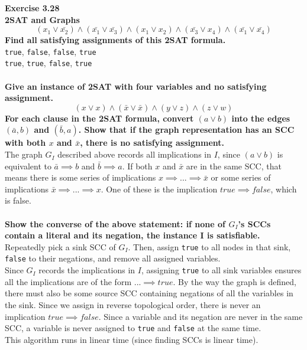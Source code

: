 \documentclass{article}
\newenvironment{problem}[2][Exercise]
    { \begin{mdframed}[backgroundcolor=gray!20] \textbf{#1 #2} \\}
    {  \end{mdframed}}
\begin{document}
\begin{problem}{3.28}
    \textbf{2SAT and Graphs}
    \[
        (x_1 \lor \bar{x_2}) \wedge (\bar{x_1} \lor \bar{x_3}) \wedge (x_1 \lor x_2) \wedge (\bar{x_3} \lor x_4) \wedge (\bar{x_1} \lor \bar{x_4})
    \]
    \textbf{Find all satisfying assignments of this 2SAT formula.}
    \\
    \texttt{true}, \texttt{false}, \texttt{false}, \texttt{true}
    \\
    \texttt{true}, \texttt{true}, \texttt{false}, \texttt{true}
    \\
    \\
    \textbf{Give an instance of 2SAT with four variables and no satisfying assignment.}
    \[
        (x \lor x) \wedge (\bar{x} \lor \bar{x}) \wedge (y \lor z) \wedge (z \lor w)
    \]
    \textbf{For each clause in the 2SAT formula, convert $(a \lor b)$ into the edges $(\bar{a}, b)$ and $(\bar{b}, a)$. Show that if the graph representation has an SCC with both $x$ and $\bar{x}$, there is no satisfying assignment.}
    \\
    The graph $G_I$ described above records all implications in $I$, since $(a \lor b)$ is equivalent to $\bar{a} \implies b$ and $\bar{b} \implies a$. If both $x$ and $\bar{x}$ are in the same SCC, that means there is some series of implications $x \implies ... \implies \bar{x}$ or some series of implications $\bar{x} \implies ... \implies x$. One of these is the implication $true \implies false$, which is false.
    \\
    \\
    \textbf{Show the converse of the above statement: if none of $G_I$'s SCCs contain a literal and its negation, the instance I is satisfiable.}
    \\
    Repeatedly pick a sink SCC of $G_I$. Then, assign \texttt{true} to all nodes in that sink, \texttt{false} to their negations, and remove all assigned variables. 
    \\
    Since $G_I$ records the implications in $I$, assigning \texttt{true} to all sink variables ensures all the implications are of the form $... \implies true$. By the way the graph is defined, there must also be some source SCC containing negations of all the variables in the sink. Since we assign in reverse topological order, there is never an implication $true \implies false$. Since a variable and its negation are never in the same SCC, a variable is never assigned to \texttt{true} and \texttt{false} at the same time.
    \\
    This algorithm runs in linear time (since finding SCCs is linear time). 

\end{problem}
\end{document}
